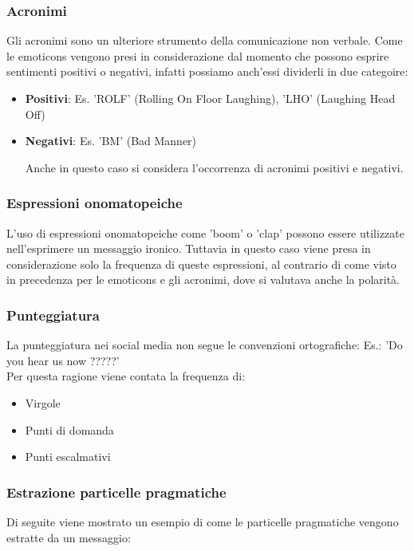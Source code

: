 \documentclass[oneside]{book}
\begin{document}
\subsubsection{Acronimi}
Gli acronimi sono un ulteriore strumento della comunicazione non verbale. Come le emoticons vengono presi in considerazione dal momento che possono esprire sentimenti positivi o negativi, infatti possiamo anch'essi dividerli in due categoire:

\begin{itemize}
	\item
	\textbf{Positivi}: Es. 'ROLF' (Rolling On Floor Laughing), 'LHO' (Laughing Head Off)
	\item
	\textbf{Negativi}: Es. 'BM' (Bad Manner)
	
Anche in questo caso si considera l'occorrenza di acronimi positivi e negativi.
\end{itemize}

\subsubsection{Espressioni onomatopeiche}
L'uso di espressioni onomatopeiche come 'boom' o 'clap' possono essere utilizzate nell'esprimere un messaggio ironico. Tuttavia in questo caso viene presa in considerazione solo la frequenza di queste espressioni, al contrario di come visto in precedenza per le emoticons e gli acronimi, dove si valutava anche la polarità.

\subsubsection{Punteggiatura}
La punteggiatura nei social media non segue le convenzioni ortografiche: Es.: 'Do you hear us now ?????'\\
Per questa ragione viene contata la frequenza di:
\begin{itemize}
	\item Virgole
	
	\item Punti di domanda
	
	\item Punti escalmativi
\end{itemize}

\subsubsection{Estrazione particelle pragmatiche}
Di seguite viene mostrato un esempio di come le particelle pragmatiche vengono estratte da un messaggio:
\end{document}
